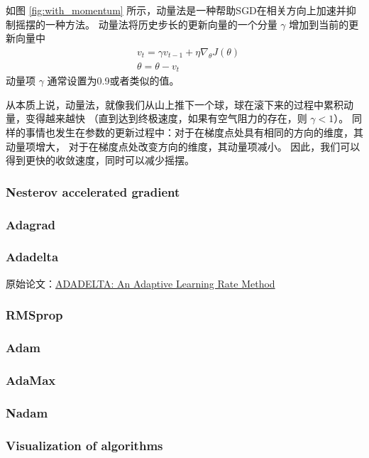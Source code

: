 \documentclass[a4paper,10pt]{ctexbook}
\begin{document}
如图 \ref{fig:with_momentum} 所示，动量法是一种帮助SGD在相关方向上加速并抑制摇摆的一种方法。
动量法将历史步长的更新向量的一个分量 $\gamma$ 增加到当前的更新向量中
\begin{align*}
    & v_t = \gamma v_{t-1} + \eta \nabla_{\theta}{J(\theta)} \\
    & \theta = \theta - v_{t}
\end{align*}
动量项 $\gamma$ 通常设置为0.9或者类似的值。

从本质上说，动量法，就像我们从山上推下一个球，球在滚下来的过程中累积动量，变得越来越快
（直到达到终极速度，如果有空气阻力的存在，则 $\gamma < 1$）。
同样的事情也发生在参数的更新过程中：对于在梯度点处具有相同的方向的维度，其动量项增大，
对于在梯度点处改变方向的维度，其动量项减小。
因此，我们可以得到更快的收敛速度，同时可以减少摇摆。


\subsubsection{Nesterov accelerated gradient}

\subsubsection{Adagrad}




\subsubsection{Adadelta}
原始论文：\href{https://arxiv.org/abs/1212.5701}{ADADELTA: An Adaptive Learning Rate Method}






\subsubsection{RMSprop}
\subsubsection{Adam}
\subsubsection{AdaMax}
\subsubsection{Nadam}
\subsubsection{Visualization of algorithms}
\end{document}

